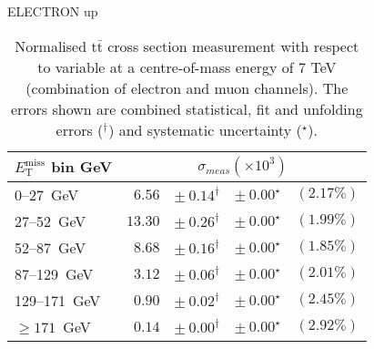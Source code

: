 \documentclass{article}
\newcommand{\ttbar}{\ensuremath{\text{t}\bar{\text{t}}}\xspace}
\newcommand{\GeV}{GeV}
\begin{document}
ELECTRON up
\begin{table}[H]
\setlength{\tabcolsep}{2pt}
\centering
\caption{Normalised \ttbar cross section measurement with respect to \MET variable
at a centre-of-mass energy of 7 TeV (combination of electron and muon channels). The errors shown are combined statistical, fit and unfolding errors ($^\dagger$) and systematic uncertainty ($^\star$).}
\label{tab:MET_xsections_7TeV_Electron_up_combined}
\begin{tabular}{lrrrr}
\hline
$E_{\mathrm{T}}^{\mathrm{miss}}$ bin GeV & \multicolumn{4}{c}{$\sigma_{meas} \left(\times
10^{3}\right)$}\\
\hline
0--27~\GeV &  $6.56$ & $ \pm~ 0.14^\dagger$ & $ \pm~ 0.00^\star$ & $(2.17\%)$\\ 
27--52~\GeV &  $13.30$ & $ \pm~ 0.26^\dagger$ & $ \pm~ 0.00^\star$ & $(1.99\%)$\\ 
52--87~\GeV &  $8.68$ & $ \pm~ 0.16^\dagger$ & $ \pm~ 0.00^\star$ & $(1.85\%)$\\ 
87--129~\GeV &  $3.12$ & $ \pm~ 0.06^\dagger$ & $ \pm~ 0.00^\star$ & $(2.01\%)$\\ 
129--171~\GeV &  $0.90$ & $ \pm~ 0.02^\dagger$ & $ \pm~ 0.00^\star$ & $(2.45\%)$\\ 
$\geq 171$~\GeV &  $0.14$ & $ \pm~ 0.00^\dagger$ & $ \pm~ 0.00^\star$ & $(2.92\%)$\\ 
\hline 
\end{tabular}
\end{table}
\end{document}
